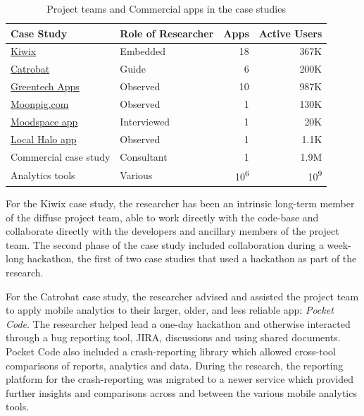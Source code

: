 \begin{table}[htbp!]
    \centering
    \small
    \setlength{\tabcolsep}{4pt} %
    \begin{tabular}{llrr}
      Case Study &Role of Researcher &Apps &Active Users\\
      \hline
       \href{https://play.google.com/store/apps/dev?id=9116215767541857492&hl=en_GB}{Kiwix}  &Embedded &18 &367K\\
       \href{https://play.google.com/store/apps/developer?id=Catrobat&hl=en_GB}{Catrobat} &Guide &6 &200K\\
       \href{https://play.google.com/store/apps/dev?id=7665838187257770408}{Greentech Apps} &Observed &10 &987K\\
       \href{https://play.google.com/store/apps/developer?id=Moonpig.com&hl=en_GB}{Moonpig.com} &Observed &1 &130K\\
       \href{https://play.google.com/store/apps/details?id=boundless.moodgym&hl=en_GB}{Moodspace app} &Interviewed &1 &20K\\
       \href{https://play.google.com/store/apps/details?id=com.localhalo.app&hl=en_GB}{Local Halo app} &Observed &1 &1.1K\\
       Commercial case study &Consultant &1 &1.9M\\
       Analytics tools &Various &10\textsuperscript{6} &10\textsuperscript{9} \\
    \end{tabular}
    \caption{Project teams and Commercial apps in the case studies}
    \label{tab:case_studies}
\end{table}

For the Kiwix case study, the researcher has been an intrinsic long-term member of the diffuse project team, able to work directly with the code-base and collaborate directly with the developers and ancillary members of the project team. The second phase of the case study included collaboration during a week-long hackathon, the first of two case studies that used a hackathon as part of the research. 

For the Catrobat case study, the researcher advised and assisted the project team to apply mobile analytics to their larger, older, and less reliable app: \emph{Pocket Code}. The researcher helped lead a one-day hackathon and otherwise interacted through a bug reporting tool, JIRA, discussions and using shared documents. Pocket Code also included a crash-reporting library which allowed cross-tool comparisons of reports, analytics and data. During the research, the reporting platform for the crash-reporting was migrated to a newer service which provided further insights and comparisons across and between the various mobile analytics tools.

